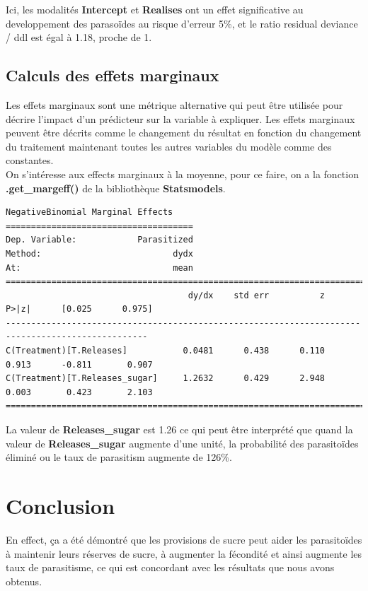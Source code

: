\documentclass[12pt]{article}
\begin{document}
Ici, les modalités \textbf{Intercept} et \textbf{Realises} ont un effet significative au developpement des parasoïdes au risque d'erreur 5\%, et le ratio residual deviance / ddl est égal à 1.18, proche de 1.

\subsection{Calculs des effets marginaux}
Les effets marginaux sont une métrique alternative qui peut être utilisée pour décrire l'impact d'un prédicteur sur la variable à expliquer. Les effets marginaux peuvent être décrits comme le changement du résultat en fonction du changement du traitement maintenant toutes les autres variables du modèle comme des constantes.\\
On s'intéresse aux effects marginaux à la moyenne, pour ce faire, on a la fonction \textbf{.get\_margeff()} de la bibliothèque \textbf{Statsmodels}.


\begin{lstlisting}[caption=Python-output Marginal effects]
  NegativeBinomial Marginal Effects  
=====================================
Dep. Variable:            Parasitized
Method:                          dydx
At:                              mean
==================================================================================================
                                    dy/dx    std err          z      P>|z|      [0.025      0.975]
--------------------------------------------------------------------------------------------------
C(Treatment)[T.Releases]           0.0481      0.438      0.110      0.913      -0.811       0.907
C(Treatment)[T.Releases_sugar]     1.2632      0.429      2.948      0.003       0.423       2.103
==================================================================================================
\end{lstlisting}

La valeur de \textbf{Releases\_sugar} est 1.26 ce qui peut être interprété que quand la valeur de \textbf{Releases\_sugar} augmente d'une unité, la probabilité des parasitoïdes éliminé ou le taux de parasitism augmente de 126\%. 

\section{Conclusion}
En effect, ça a été démontré que les provisions de sucre peut aider les parasitoïdes à maintenir leurs réserves de sucre, à augmenter la fécondité et ainsi augmente les taux de parasitisme, ce qui est concordant avec les résultats que nous avons obtenus.
\end{document}
